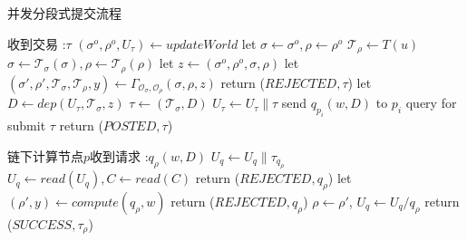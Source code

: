 \begin{breakablealgorithm}
    \caption{并发分段式提交流程}
    \label{alg:ch3-7}
    \begin{algorithmic} 
        \item[收到交易]:$\tau$
        \STATE $(\sigma^o, \rho^o, U_\tau) \leftarrow updateWorld$
        \STATE let $\sigma \leftarrow \sigma^o, \rho \leftarrow \rho^o$
        \STATE $\mathcal{T}_\rho \leftarrow T(u)$
        \STATE $\sigma \leftarrow \mathcal{T}_\sigma(\sigma), \rho \leftarrow \mathcal{T}_\rho(\rho)$
        \ENDFOR
        \STATE let $z \leftarrow (\sigma^o, \rho^o, \sigma, \rho)$
        \STATE let $(\sigma', \rho', \mathcal{T}_\sigma, \mathcal{T}_\rho, y) \leftarrow \Gamma_{\mathcal{O}_\sigma, \mathcal{O}_\rho}(\sigma, \rho, z)$
        \STATE return ($REJECTED, \tau$)
        \ENDIF
        \STATE let $D \leftarrow dep(U_\tau, \mathcal{T}_\sigma, z)$
        \STATE $\tau \leftarrow (\mathcal{T}_\sigma, D)$
        \STATE $U_\tau \leftarrow U_\tau \parallel \tau$
        \STATE send $q_{p_i}(w, D)$ to $p_i$
        \ENDFOR
        \STATE query for submit $\tau$
        \STATE return ($POSTED, \tau$)
        \item[链下计算节点$p$收到请求]:$q_\rho(w, D)$
        \STATE $U_q \leftarrow U_q \parallel \tau_{q_\rho}$
        \REPEAT 
        \STATE $U_q \leftarrow read(U_q), C \leftarrow read(C)$
        \STATE return ($REJECTED, q_\rho$)
        \ENDIF
        \STATE let $(\rho', y) \leftarrow compute(q_\rho, w)$
        \STATE return ($REJECTED, q_\rho$)
        \ENDIF
        \STATE $\rho \leftarrow \rho'$, $U_q \leftarrow U_q / q_\rho$
        \STATE return ($SUCCESS, \tau_\rho$)
    \end{algorithmic}
\end{breakablealgorithm}
